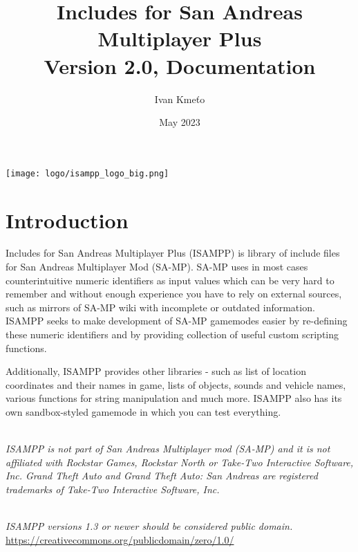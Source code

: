 \documentclass{article}
\title{Includes for San Andreas Multiplayer Plus\\Version 2.0, Documentation}
\author{Ivan Kmeťo}
\date{May 2023}
\begin{document}
\maketitle
\begin{center}
\texttt{[image: logo/isampp\_logo\_big.png]}
\end{center}


\newpage
\tableofcontents


\newpage
\section{Introduction}
Includes for San Andreas Multiplayer Plus (ISAMPP) is library of include files for San Andreas Multiplayer Mod (SA-MP). SA-MP uses in most cases counterintuitive numeric identifiers as input values which can be very hard to remember and without enough experience you have to rely on external sources, such as mirrors of SA-MP wiki with incomplete or outdated information. ISAMPP seeks to make development of SA-MP gamemodes easier by re-defining these numeric identifiers and by providing collection of useful custom scripting functions.

\bigskip
\noindent Additionally, ISAMPP provides other libraries - such as list of location coordinates and their names in game, lists of objects, sounds and vehicle names, various functions for string manipulation and much more. ISAMPP also has its own sandbox-styled gamemode in which you can test everything.

\textit{\\ISAMPP is not part of San Andreas Multiplayer mod (SA-MP) and it is not affiliated with Rockstar Games, Rockstar North or Take-Two Interactive Software, Inc. Grand Theft Auto and Grand Theft Auto: San Andreas are registered trademarks of Take-Two Interactive Software, Inc.}

\textit{\\ISAMPP versions 1.3 or newer should be considered public domain.}
\\\url{https://creativecommons.org/publicdomain/zero/1.0/}
\end{document}
